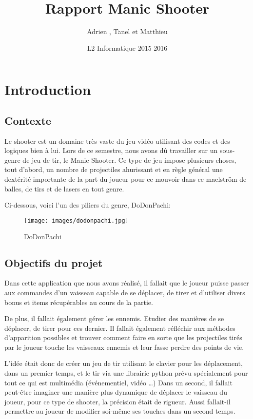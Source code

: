\documentclass[a4paper, 12pt]{report}
\title{Rapport Manic Shooter}
\author{Adrien \bsc{Boutigny}, Tanel \bsc{Creusier} et Matthieu \bsc{Dechipre}}
\date{L2 Informatique 2015 2016}
\begin{document}
\maketitle

\tableofcontents

\chapter{Introduction}
	\section{Contexte}
Le shooter est un domaine très vaste du jeu vidéo utilisant des codes et des
logiques bien à lui. Lors de ce semestre, nous avons dû travailler sur un
sous-genre de jeu de tir, le Manic Shooter. Ce type de jeu impose plusieurs
choses, tout d'abord, un nombre de projectiles ahurissant et en règle général
une dextérité importante de la part du joueur pour ce mouvoir dans ce maelström
de balles, de tirs et de lasers en tout genre.

Ci-dessous, voici l'un des piliers du genre, DoDonPachi:

\begin{figure}[!ht]
\centering
\texttt{[image: images/dodonpachi.jpg]}
\caption{DoDonPachi}
\end{figure}

    \section{Objectifs du projet}
Dans cette application que nous avons réalisé, il fallait que le joueur
puisse passer aux commandes d'un vaisseau capable de se déplacer, de tirer et
d'utiliser divers bonus et items récupérables au cours de la partie. \newline

\noindent De plus, il fallait également gérer les ennemis. Etudier des manières de se
déplacer, de tirer pour ces dernier. Il fallait également réfléchir aux
méthodes d'apparition possibles et trouver comment faire en sorte que les
projectiles tirés par le joueur touche les vaisseaux ennemis et leur fasse
perdre des points de vie.\newline

\noindent L'idée était donc de créer un jeu de tir utilisant le clavier pour les
déplacement, dans un premier temps, et le tir via une librairie python prévu
spécialement pour  tout ce qui est multimédia (événementiel, vidéo \ldots) Dans
un second, il fallait peut-être imaginer une manière plus dynamique de déplacer
le vaisseau du joueur, pour ce type de shooter, la précision était de rigueur.
Aussi fallait-il permettre au joueur de modifier soi-même ses touches dans un
second temps. \newline
\end{document}
